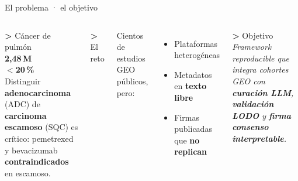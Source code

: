 \documentclass[aspectratio=169, 11pt]{beamer}
\newcommand{\kicker}[1]{{\ttfamily\small\color{verdeTerm}\textbf{>} #1}}
\begin{document}
\begin{frame}{El problema · el objetivo}
  \vspace{0.05cm}
  \begin{columns}[T]
    \kicker{Cáncer de pulmón}\\[0.15cm]
    {\fontsize{38pt}{38pt}\selectfont\color{verdeTerm}\textbf{2{,}48\,M}}\\[0.15cm]
    {\fontsize{30pt}{30pt}\selectfont\color{verdeTerm}\textbf{$<$20\,\%}}\\[0.25cm]

    {\small Distinguir \textbf{adenocarcinoma} (ADC) de
    \textbf{carcinoma escamoso} (SQC) es crítico:
    pemetrexed y bevacizumab \textbf{contraindicados}
    en escamoso.}

    \kicker{El reto}\\[0.15cm]
    {\small Cientos de estudios GEO públicos, pero:
    \begin{itemize}\setlength\itemsep{1pt}
      \item Plataformas heterogéneas
      \item Metadatos en \textbf{texto libre}
      \item Firmas publicadas que \textbf{no replican}
    \end{itemize}}

    \vspace{0.25cm}
    \kicker{Objetivo}\\[0.1cm]
    {\itshape\small\color{verdeOsc}Framework reproducible que integra
    cohortes GEO con \textbf{curación LLM}, \textbf{validación LODO}
    y \textbf{firma consenso interpretable}.}
  \end{columns}
\end{frame}
\end{document}
